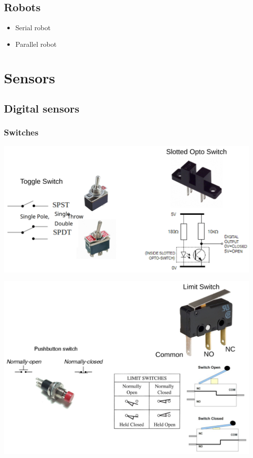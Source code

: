 \documentclass[11pt]{article}
\begin{document}
\subsection{Robots}
\label{sec:org526d850}
\begin{itemize}
\item Serial robot
\item Parallel robot
\end{itemize}
\section{Sensors}
\label{sec:orgfbf3431}

\subsection{Digital sensors}
\label{sec:org96515f7}

\subsubsection{Switches}
\label{sec:org696f135}
\begin{center}
\includegraphics[width=.9\linewidth]{./images/toggle-and-slotted-opto-switches.png}
\end{center}
\begin{center}
\includegraphics[width=.9\linewidth]{./images/pushbutton-and-limit-switches.png}
\end{center}
\end{document}

